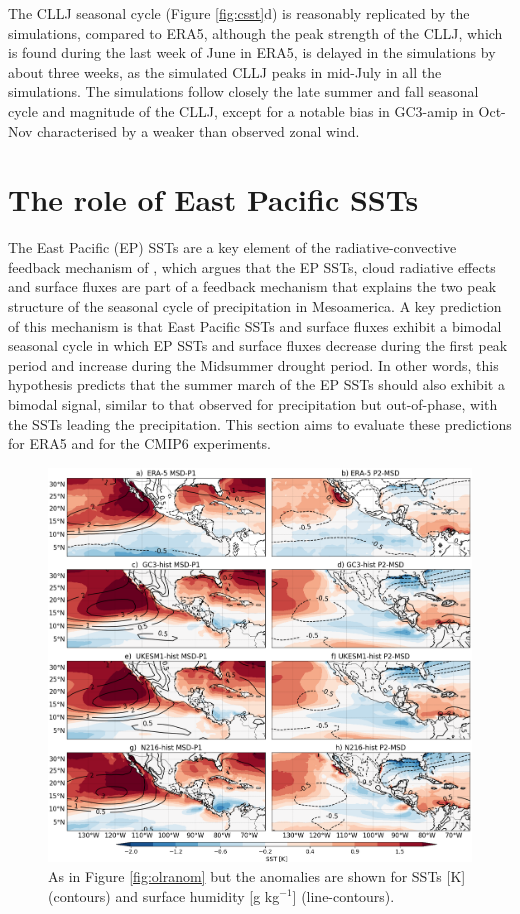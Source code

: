 The CLLJ seasonal cycle (Figure \ref{fig:csst}d) is reasonably replicated by the simulations, compared to ERA5, although the peak strength of the CLLJ, which is found during the last week of June in ERA5, is delayed in the simulations by about three weeks, as the simulated CLLJ peaks in mid-July in all the simulations.
The simulations follow closely the late summer and fall seasonal cycle and magnitude of the CLLJ, except for a notable bias in GC3-amip in Oct-Nov characterised by a weaker than observed zonal wind.

\section{The role of East Pacific SSTs}

 The East Pacific (EP) SSTs are a key element of the radiative-convective feedback mechanism of \cite{magana1999}, which argues that the EP SSTs, cloud radiative effects and surface fluxes are part of a feedback mechanism that explains the two peak structure of the seasonal cycle of precipitation in Mesoamerica. A key prediction of this mechanism is that East Pacific SSTs and surface fluxes exhibit a bimodal  seasonal cycle in which EP SSTs and surface fluxes decrease during the first peak period and increase during the Midsummer drought period. In other words, this hypothesis predicts that the summer march of the EP SSTs should also exhibit a bimodal signal, similar to that observed for precipitation but out-of-phase, with the SSTs leading the precipitation. This section aims to evaluate these predictions for ERA5 and for the CMIP6 experiments. 

 
\begin{figure}[b!]
\includegraphics[width=\linewidth]{figures/fig4_sstv_3.png}
\caption[Composite SST anomalies]{As in Figure \ref{fig:olranom} but the anomalies are shown for SSTs [K] (contours) and surface humidity [g kg$^{-1}$] (line-contours).  }
\label{fig:msdsstanom}
\end{figure}

